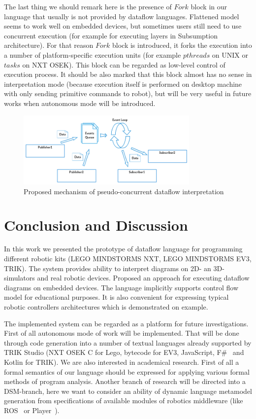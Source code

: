 \documentclass[conference,compsoc]{IEEEtran}
\begin{document}
The last thing we should remark here is the presence of $Fork$ block in our language that usually is not provided by dataflow languages. Flattened model seems to work well on embedded devices, but sometimes users still need to use concurrent execution (for example for executing layers in Subsumption architecture). For that reason $Fork$ block is introduced, it forks the execution into a number of platform-specific execution units (for example $pthreads$ on UNIX or $tasks$ on NXT OSEK). This block can be regarded as low-level control of execution process. It should be also marked that this block almost has no sense in interpretation mode (because execution itself is performed on desktop machine with only sending primitive commands to robot), but will be very useful in future works when autonomous mode will be introduced.

\begin{figure}[ht]
	\centering
	\includegraphics[width=3.5in]{Interaction.png}
	\caption{Proposed mechanism of pseudo-concurrent dataflow interpretation}
	\label{image:interpreter-interaction}
\end{figure}


\section{Conclusion and Discussion}
\label{sec:Conclusion}
In this work we presented the prototype of dataflow language for programming different robotic kits (LEGO MINDSTORMS NXT, LEGO MINDSTORMS EV3, TRIK). The system provides ability to interpret diagrams on 2D- an 3D-simulators and real robotic devices. Proposed an approach for executing dataflow diagrams on embedded devices. The language implicitly supports control flow model for educational purposes. It is also convenient for expressing typical robotic controllers architectures which is demonstrated on example.

The implemented system can be regarded as a platform for future investigations. First of all autonomous mode of work will be implemented. That will be done through code generation into a number of textual languages already supported by TRIK Studio (NXT OSEK C for Lego, bytecode for EV3, JavaScript, F\#~\cite{kirsanov2014robotics} and Kotlin for TRIK). We are also interested in academical research. First of all a formal semantics of our language should be expressed for applying various formal methods of program analysis. Another branch of research will be directed into a DSM-branch, here we want to consider an ability of dynamic language metamodel generation from specifications of available modules of robotics middleware (like ROS~\cite{quigley2009ros} or Player~\cite{gerkey2003player}).

\newpage


\end{document}
